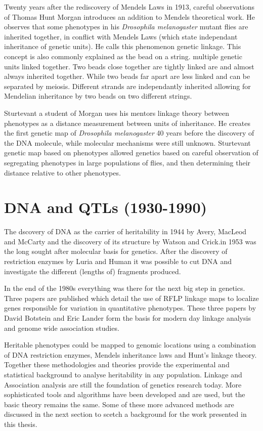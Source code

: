 Twenty years after the rediscovery of Mendels Laws in 1913, careful observations of 
Thomas Hunt Morgan introduces an addition to Mendels theoretical work. He observes 
that some phenotypes in his \emph{Drosophila melanogaster} mutant flies are inherited 
together, in conflict with Mendels Laws (which state independant inheritance of 
genetic units). He calls this phenomenon genetic linkage. This concept is also commonly 
explained as the bead on a string. multiple genetic units linked together. Two beads 
close together are tightly linked are and almost always inherited together. While 
two beads far apart are less linked and can be separated by meiosis. Different 
strands are independantly inherited allowing for Mendelian inheritance by two beads 
on two different strings.

Sturtevant a student of Morgan uses his mentors linkage theory between phenotypes 
as a distance measurement between units of inheritance. He creates the first genetic 
map of \emph{Drosophila melanogaster} 40 years before the discovery of the DNA molecule, 
while molecular mechanisms were still unknown. Sturtevant genetic map based on 
phenotypes allowed genetics based on careful observation of segregating phenotypes in 
large populations of flies, and then determining their distance relative to other 
phenotypes.

\section{DNA and QTLs (1930-1990)}

The dscovery of DNA as the carrier of heritability in 1944 by Avery, MacLeod and McCarty 
\cite{Avery:1944} and the discovery of its structure by Watson and Crick.in 1953 
\cite{Watson:1953} was the long sought after molecular basis for genetics. After the 
discovery of restriction enzymes by Luria and Human \cite{Luria:1952} it was possible 
to cut DNA and investigate the different (lengths of) fragments produced.

In the end of the 1980s everything was there for the next big step in genetics. Three 
papers are published which detail the use of RFLP linkage maps to localize genes 
responsible for variation in quantitative phenotypes. These three papers by David Botstein 
and Eric Lander \cite{Lander:1986, Lander:1987, Lander:1989} form the basis for modern 
day linkage analysis and genome wide association studies. 

Heritable phenotypes could be mapped to genomic locations using a combination of DNA 
restriction enzymes, Mendels inheritance laws and Hunt's linkage theory. Together these 
methodologies and theories provide the experimental and statistical background to 
analyse heritability in any population. Linkage and Association analysis are still the 
foundation of genetics research today. More sophisticated tools and algorithms have been 
developed and are used, but the basic theory remains the same. Some of these more 
advanced methods are discussed in the next section to scetch a background for the work 
presented in this thesis.

